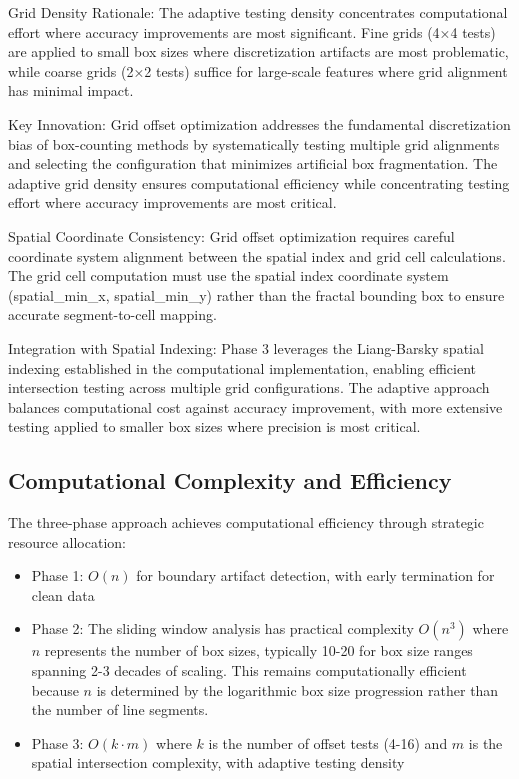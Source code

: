\documentclass[preprint,12pt]{elsarticle}
\def\textbf#1{#1}%
\begin{document}
\textbf{Grid Density Rationale}: The adaptive testing density concentrates computational effort where accuracy improvements are most significant. Fine grids (4×4 tests) are applied to small box sizes where discretization artifacts are most problematic, while coarse grids (2×2 tests) suffice for large-scale features where grid alignment has minimal impact.

\textbf{Key Innovation}: Grid offset optimization addresses the fundamental discretization bias of box-counting methods by systematically testing multiple grid alignments and selecting the configuration that minimizes artificial box fragmentation. The adaptive grid density ensures computational efficiency while concentrating testing effort where accuracy improvements are most critical.

\textbf{Spatial Coordinate Consistency}: Grid offset optimization requires careful coordinate system alignment between the spatial index and grid cell calculations. The grid cell computation must use the spatial index coordinate system (spatial\_min\_x, spatial\_min\_y) rather than the fractal bounding box to ensure accurate segment-to-cell mapping.

\textbf{Integration with Spatial Indexing}: Phase 3 leverages the Liang-Barsky spatial indexing established in the computational implementation, enabling efficient intersection testing across multiple grid configurations. The adaptive approach balances computational cost against accuracy improvement, with more extensive testing applied to smaller box sizes where precision is most critical.

\subsection{Computational Complexity and Efficiency}

The three-phase approach achieves computational efficiency through strategic resource allocation:

\begin{itemize}
\item \textbf{Phase 1}: $O(n)$ for boundary artifact detection, with early termination for clean data

\item \textbf{Phase 2}: The sliding window analysis has practical complexity $O(n^3)$ where $n$ represents the number of box sizes, typically 10-20 for box size ranges spanning 2-3 decades of scaling. This remains computationally efficient because $n$ is determined by the logarithmic box size progression rather than the number of line segments.

\item \textbf{Phase 3}: $O(k \cdot m)$ where $k$ is the number of offset tests (4-16) and $m$ is the spatial intersection complexity, with adaptive testing density
\end{itemize}
\end{document}
